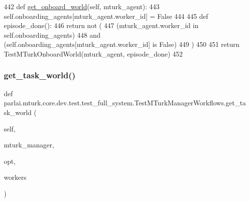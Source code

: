\begin{DoxyCode}
442     \textcolor{keyword}{def }\hyperlink{namespaceparlai_1_1mturk_1_1core_1_1dev_1_1test_1_1test__mturk__manager_aafd69ff9f051e4dd382a610b58f65710}{get\_onboard\_world}(self, mturk\_agent):
443         self.onboarding\_agents[mturk\_agent.worker\_id] = \textcolor{keyword}{False}
444 
445         \textcolor{keyword}{def }episode\_done():
446             \textcolor{keywordflow}{return} \textcolor{keywordflow}{not} (
447                 (mturk\_agent.worker\_id \textcolor{keywordflow}{in} self.onboarding\_agents)
448                 \textcolor{keywordflow}{and} (self.onboarding\_agents[mturk\_agent.worker\_id] \textcolor{keywordflow}{is} \textcolor{keyword}{False})
449             )
450 
451         \textcolor{keywordflow}{return} TestMTurkOnboardWorld(mturk\_agent, episode\_done)
452 
\end{DoxyCode}
\mbox{\label{classparlai_1_1mturk_1_1core_1_1dev_1_1test_1_1test__full__system_1_1TestMTurkManagerWorkflows_a9499834ef926100c17c84ec394a01086}} 
\subsubsection{\texorpdfstring{get\+\_\+task\+\_\+world()}{get\_task\_world()}}
{\footnotesize\ttfamily def parlai.\+mturk.\+core.\+dev.\+test.\+test\+\_\+full\+\_\+system.\+Test\+M\+Turk\+Manager\+Workflows.\+get\+\_\+task\+\_\+world (\begin{DoxyParamCaption}\item[{}]{self,  }\item[{}]{mturk\+\_\+manager,  }\item[{}]{opt,  }\item[{}]{workers }\end{DoxyParamCaption})}



